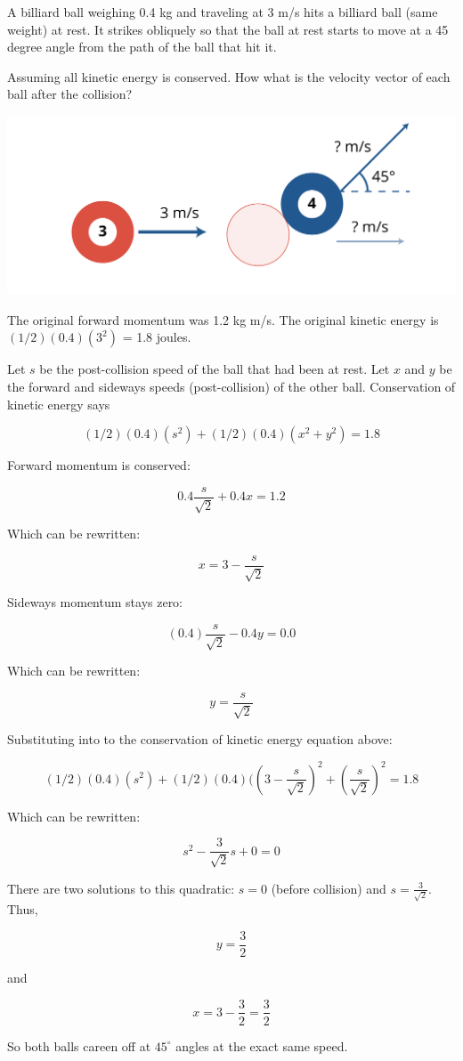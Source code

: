 \begin{Exercise}[title={Billiard Balls}, label=billiards]
  
A billiard ball weighing 0.4 kg and traveling at 3 m/s hits a billiard
ball (same weight) at rest. It strikes obliquely so that the ball at rest starts to
move at a 45 degree angle from the path of the ball that hit it.

Assuming all kinetic energy is conserved. How what is the velocity
vector of each ball after the collision?

\includegraphics[width=.75\textwidth]{poolball.png}

\end{Exercise}
\begin{Answer}[ref=billiards]

  The original forward momentum was 1.2 kg m/s.  The original kinetic energy is $(1/2)(0.4)(3^2)$ = 1.8 joules. 

  Let $s$ be the post-collision speed of the ball that had been at
  rest.  Let $x$ and $y$ be the forward and sideways speeds
  (post-collision) of the other ball. Conservation of kinetic energy says

  $$(1/2)(0.4)(s^2) + (1/2)(0.4)(x^2+y^2) = 1.8$$

  Forward momentum is conserved:

  $$0.4\frac{s}{\sqrt{2}} + 0.4 x = 1.2$$

  Which can be rewritten:

  $$x = 3 - \frac{s}{\sqrt{2}}$$
  
  Sideways momentum stays zero:

  $$(0.4)\frac{s}{\sqrt{2}} - 0.4 y = 0.0$$

  Which can be rewritten:

  $$y = \frac{s}{\sqrt{2}}$$

  Substituting into to the conservation of kinetic energy equation above:

  $$(1/2)(0.4)(s^2) + (1/2)(0.4)(\left(3 - \frac{s}{\sqrt{2}}\right)^2+\left(\frac{s}{\sqrt{2}}\right)^2 = 1.8$$

  Which can be rewritten:

  $$s^2 - \frac{3}{\sqrt{2}} s + 0 = 0$$

  There are two solutions to this quadratic: $s = 0$ (before collision) and $s = \frac{3}{\sqrt{2}}$. Thus,

  $$y = \frac{3}{2}$$

  and

  $$x = 3 - \frac{3}{2} = \frac{3}{2}$$

  So both balls careen off at $45^\circ$ angles at the exact same speed. 

  
\end{Answer}



